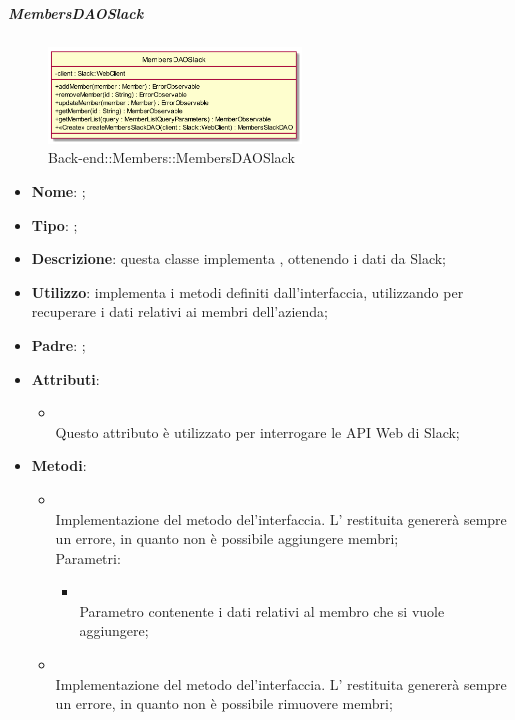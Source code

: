 \hypertarget{MembersDAOSlack_label}{\subparagraph{MembersDAOSlack}}
\begin{figure}[h]
	\centering
	\includegraphics[width=0.60\textwidth,height=\textheight,keepaspectratio]{images/ClassMembersDAOSlack.png}
	\caption{Back-end::Members::MembersDAOSlack}
\end{figure}
\begin{itemize}
	\item \textbf{Nome}: ;
	\item \textbf{Tipo}: ;
	\item \textbf{Descrizione}: questa classe implementa , ottenendo i dati da Slack;
	\item \textbf{Utilizzo}: implementa i metodi definiti dall'interfaccia, utilizzando  per recuperare i dati relativi ai membri dell'azienda;
	\item \textbf{Padre}: ;
	\item \textbf{Attributi}:
	\begin{itemize}
		\item[]  \\
		Questo attributo è utilizzato per interrogare le API Web di Slack;
	\end{itemize}
	\item \textbf{Metodi}:
	\begin{itemize}
		\item[]  \\		Implementazione del metodo del'interfaccia. L' restituita genererà sempre un errore, in quanto non è possibile aggiungere membri;\\
		Parametri:
		\begin{itemize}
			\item {} \\
			Parametro contenente i dati relativi al membro che si vuole aggiungere;
		\end{itemize}
		\item[]  \\		Implementazione del metodo del'interfaccia. L' restituita genererà sempre un errore, in quanto non è possibile rimuovere membri;\\

\end{itemize}
\end{itemize}
